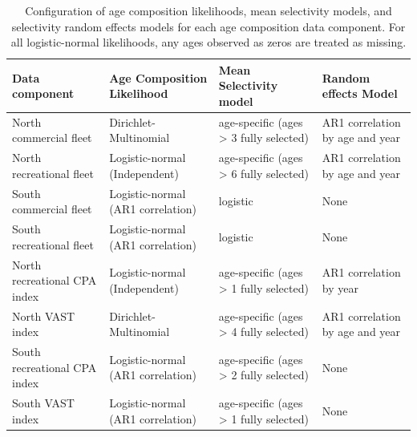 \documentclass[
]{article}
\begin{document}
\begin{landscape}\begin{table}

\caption{\label{tab:age-comp-sel-table}Configuration of age composition likelihoods, mean selectivity models, and selectivity random effects models for each age composition data component. For all logistic-normal likelihoods, any ages observed as zeros are treated as missing.}
\centering
\begin{tabular}[t]{llll}
\toprule
Data component & Age Composition Likelihood & Mean Selectivity model & Random effects Model\\
\midrule
North commercial fleet & Dirichlet-Multinomial & age-specific (ages > 3 fully selected) & AR1 correlation by age and year\\
North recreational fleet & Logistic-normal (Independent) & age-specific (ages > 6 fully selected) & AR1 correlation by age and year\\
South commercial fleet & Logistic-normal (AR1 correlation) & logistic & None\\
South recreational fleet & Logistic-normal (AR1 correlation) & logistic & None\\
North recreational CPA index & Logistic-normal (Independent) & age-specific (ages > 1 fully selected) & AR1 correlation by year\\
\addlinespace
North VAST index & Dirichlet-Multinomial & age-specific (ages > 4 fully selected) & AR1 correlation by age and year\\
South recreational CPA index & Logistic-normal (AR1 correlation) & age-specific (ages > 2 fully selected) & None\\
South VAST index & Logistic-normal (AR1 correlation) & age-specific (ages > 1 fully selected) & None\\
\bottomrule
\end{tabular}
\end{table}
\end{landscape}
\end{document}
